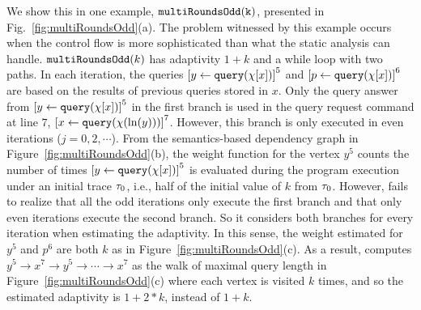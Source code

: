 
 We show this in one example, $\mathtt{multiRoundsOdd(k)}$, presented in Fig.~\ref{fig:multiRoundsOdd}(a). %
The problem witnessed by this example occurs when the control flow is more sophisticated than what the static analysis can handle. 
$\mathtt{multiRoundsOdd}(k)$
has adaptivity $1 + k$ and a  while loop with two paths.
In each iteration, the queries $\clabel{\assign{y}{\query(\chi[x])}}^{5}$
and $\clabel{\assign{p}{\query(\chi[x])}}^{6}$ are based on the results of previous queries stored in $x$.
Only the query answer from $\clabel{\assign{y}{\query(\chi[x])}}^{5}$ in the first branch
is used in the query request command at line $7$, $\clabel{\assign{x}{\query(\chi(\ln(y)))} }^{7}$.
However, this branch is only executed in even iterations ($j = 0, 2, \cdots $).
From the semantics-based dependency graph in Figure~\ref{fig:multiRoundsOdd}(b),
the weight function for the vertex $y^5$ counts the
number of times $\clabel{\assign{y}{\query(\chi[x])}}^{5}$ is evaluated during the program execution under an initial trace $\mathtt{\tau}_0$, i.e., half of the initial value of $k$ from $\mathtt{\tau}_0$.
However, {\THESYSTEM} fails to realize that all the odd iterations only execute the first branch
and that only even iterations execute the second branch. 
So it considers both branches for every iteration when estimating the adaptivity. 
In this sense, the weight estimated for $y^5$ and $p^6$ are both 
$k$ as in Figure~\ref{fig:multiRoundsOdd}(c).
As a result, {\THESYSTEM} computes $y^5  \to x^7  \to y^5  \to \cdots \to x^7 $
as the walk of maximal query length in Figure~\ref{fig:multiRoundsOdd}(c)
where each vertex is visited $k$ times, and so the estimated adaptivity is $1 + 2 * k$, instead of $1 + k$. 
%



